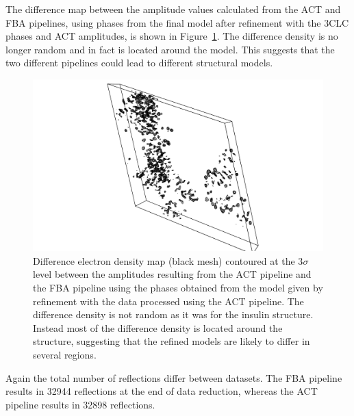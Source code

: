 The difference map between the amplitude values calculated from the ACT and FBA pipelines, using phases from the final model after refinement with the 3CLC phases and ACT amplitudes, is shown in Figure~\ref{fig:Difference electron density map - C.Esp1396I}.
The difference density is no longer random and in fact is located around the model.
This suggests that the two different pipelines could lead to different structural models.
\begin{figure}[ht!]
    \centering
    \includegraphics[width=1.0\textwidth]{figures/datared/CPROT_diff_map.png}
    \caption[Difference electron density map for the C.Esp1396I dataset.]{Difference electron density map (black mesh) contoured at the 3$\sigma$ level between the amplitudes resulting from the ACT pipeline and the FBA pipeline using the phases obtained from the model given by refinement with the data processed using the ACT pipeline.
    The difference density is not random as it was for the insulin structure.
    Instead most of the difference density is located around the structure, suggesting that the refined models are likely to differ in several regions.}
    \label{fig:Difference electron density map - C.Esp1396I}
\end{figure}

Again the total number of reflections differ between datasets.
The FBA pipeline results in 32944 reflections at the end of data reduction, whereas the ACT pipeline results in 32898 reflections.


